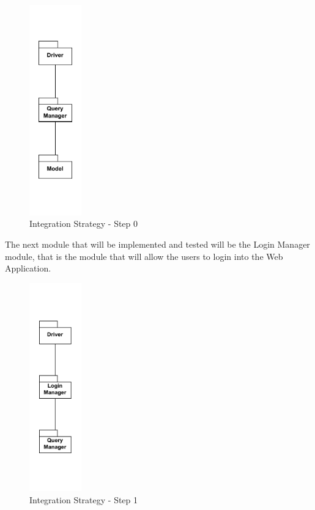 \begin{figure}[H]
    \centering
    \includegraphics[width=0.2\textwidth]{Images/Integ_0.pdf}
    \caption{Integration Strategy - Step 0}
    \label{fig:integration-strategy-step-0}
\end{figure}

\par The next module that will be implemented and tested will be the Login Manager module, that is the module that will
allow the users to login into the Web Application. 

\begin{figure}[H]
    \centering
    \includegraphics[width=0.2\textwidth]{Images/Integ_1.pdf}
    \caption{Integration Strategy - Step 1}
    \label{fig:integration-strategy-step-1}
\end{figure}


